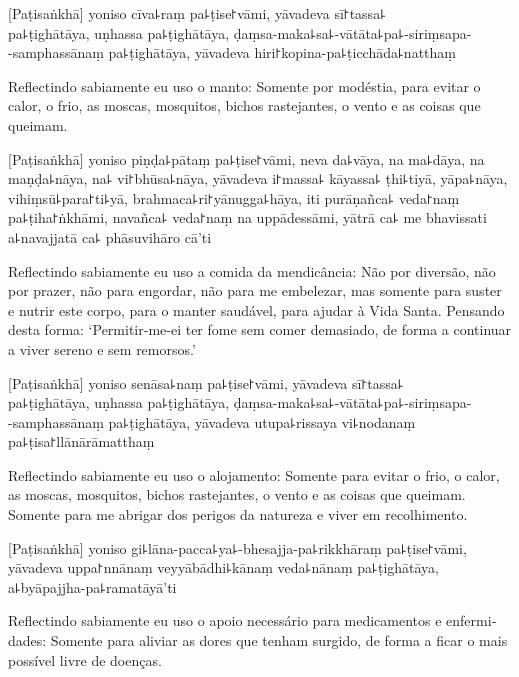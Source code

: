 \documentclass[
  babelLanguage=english,
  final,
  webversion,
]{chantingbook}
\begin{document}
[Paṭisaṅkhā] yoniso cīva꜕raṃ pa꜕ṭise꜓vāmi, yāvadeva sī꜓tassa꜕\\
pa꜕ṭighātāya, uṇhassa pa꜕ṭighātāya, ḍaṃsa-maka꜕sa꜕-vātāta꜕pa꜕-siriṃsapa-\\
-samphassānaṃ pa꜕ṭighātāya, yāvadeva hiri꜓kopina-pa꜕ṭicchāda꜕natthaṃ

\begin{english}
  Reflectindo sabiamente eu uso o manto: Somente por modéstia, para evitar o
  calor, o frio, as moscas, mosquitos, bichos rastejantes, o vento e as coisas
  que queimam.
\end{english}

[Paṭisaṅkhā] yoniso piṇḍa꜕pātaṃ pa꜕ṭise꜓vāmi, neva da꜕vāya, na ma꜕dāya, na maṇḍa꜕nāya, na꜕ vi꜓bhūsa꜕nāya, yāvadeva i꜓massa꜕ kāyassa꜕ ṭhi꜕tiyā, yāpa꜕nāya, vihiṃsū꜕para꜓ti꜕yā, brahmaca꜕ri꜓yānugga꜕hāya, iti purāṇañca꜕ veda꜓naṃ pa꜕ṭiha꜓ṅkhāmi, navañca꜕ veda꜓naṃ na uppādessāmi, yātrā ca꜕ me bhavissati a꜕navajjatā ca꜕ phāsuvihāro cā'ti

\begin{english}
  Reflectindo sabiamente eu uso a comida da mendicância: Não por diversão, não por
  prazer, não para engordar, não para me embelezar, mas somente para suster e
  nutrir este corpo, para o manter saudável, para ajudar à Vida Santa. Pensando
  desta forma: `Permitir-me-ei ter fome sem comer demasiado, de forma a
  continuar a viver sereno e sem remorsos.'
\end{english}

[Paṭisaṅkhā] yoniso senāsa꜕naṃ pa꜕ṭise꜓vāmi, yāvadeva sī꜓tassa꜕\\
pa꜕ṭighātāya, uṇhassa pa꜕ṭighātāya, ḍaṃsa-maka꜕sa꜕-vātāta꜕pa꜕-siriṃsapa-\\
-samphassānaṃ pa꜕ṭighātāya, yāvadeva utupa꜕rissaya vi꜕nodanaṃ pa꜕ṭisa꜓llānārāmatthaṃ

\begin{english}
  Reflectindo sabiamente eu uso o alojamento: Somente para evitar o frio, o calor,
  as moscas, mosquitos, bichos rastejantes, o vento e as coisas que
  queimam. Somente para me abrigar dos perigos da natureza e viver em
  recolhimento.
\end{english}

[Paṭisaṅkhā] yoniso gi꜕lāna-pacca꜕ya꜕-bhesajja-pa꜕rikkhāraṃ pa꜕ṭise꜓vāmi, yāvadeva uppa꜓nnānaṃ veyyābādhi꜕kānaṃ veda꜕nānaṃ pa꜕ṭighātāya, a꜕byāpajjha-pa꜕ramatāyā'ti

\begin{english}
  Reflectindo sabiamente eu uso o apoio necessário para medicamentos e
  enfermidades: Somente para aliviar as dores que tenham surgido, de forma a
  ficar o mais possível livre de doenças.
\end{english}
\end{document}

